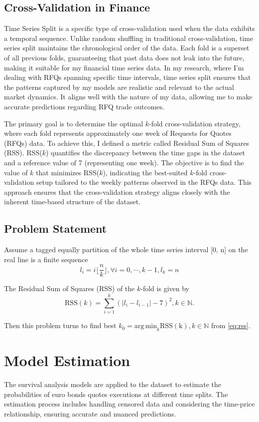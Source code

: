 \subsection{Cross-Validation in Finance}
Time Series Split is a specific type of cross-validation used when the data exhibits a temporal sequence. Unlike random shuffling in traditional cross-validation, time series split maintains the chronological order of the data. Each fold is a superset of all previous folds, guaranteeing that past data does not leak into the future, making it suitable for my financial time series data. In my research, where I'm dealing with RFQs spanning specific time intervals, time series split ensures that the patterns captured by my models are realistic and relevant to the actual market dynamics. It aligns well with the nature of my data, allowing me to make accurate predictions regarding RFQ trade outcomes.

The primary goal is to determine the optimal $k$-fold cross-validation strategy, where each fold represents approximately one week of Requests for Quotes (RFQs) data. To achieve this, I defined a metric called Residual Sum of Squares (RSS). RSS($k$) quantifies the discrepancy between the time gaps in the dataset and a reference value of 7 (representing one week). The objective is to find the value of $k$ that minimizes RSS($k$), indicating the best-suited $k$-fold cross-validation setup tailored to the weekly patterns observed in the RFQs data. This approach ensures that the cross-validation strategy aligns closely with the inherent time-based structure of the dataset.

\subsection{Problem Statement}
Assume a tagged equally partition of the whole time series interval [0, n] on the real line is a finite sequence
\[
    l_i = i \lfloor \frac{n}{k}\rfloor , \forall i = 0, \cdots, k-1, l_k = n
\]

The Residual Sum of Squares (RSS) of the $k$-fold is given by
\begin{equation}
    \mathrm{RSS}(k) = \sum_{i=1}^{k} \left( |l_i - l_{i-1}| - 7 \right)^2, k \in \mathbb{N}.\label{eq:rss}
\end{equation}

Then this problem turns to find best $k_0 = \mathrm{arg\,min}_k \mathrm{RSS(k)}, k \in \mathbb{N}$ from \eqref{eq:rss}.

\section{Model Estimation}
The survival analysis models are applied to the dataset to estimate the probabilities of euro bonds quotes executions at different time splits. The estimation process includes handling censored data and considering the time-price relationship, ensuring accurate and nuanced predictions.

